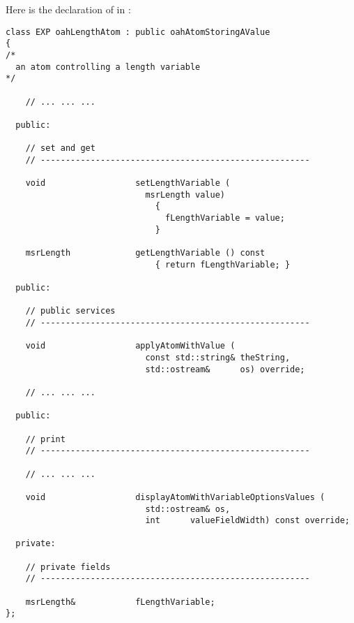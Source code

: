 Here is the declaration of  in :
\begin{lstlisting}[language=CPlusPlus]
class EXP oahLengthAtom : public oahAtomStoringAValue
{
/*
  an atom controlling a length variable
*/

	// ... ... ...

  public:

    // set and get
    // ------------------------------------------------------

    void                  setLengthVariable (
                            msrLength value)
                              {
                                fLengthVariable = value;
                              }

    msrLength             getLengthVariable () const
                              { return fLengthVariable; }

  public:

    // public services
    // ------------------------------------------------------

    void                  applyAtomWithValue (
                            const std::string& theString,
                            std::ostream&      os) override;

	// ... ... ...

  public:

    // print
    // ------------------------------------------------------

	// ... ... ...

    void                  displayAtomWithVariableOptionsValues (
                            std::ostream& os,
                            int      valueFieldWidth) const override;

  private:

    // private fields
    // ------------------------------------------------------

    msrLength&            fLengthVariable;
};
\end{lstlisting}


